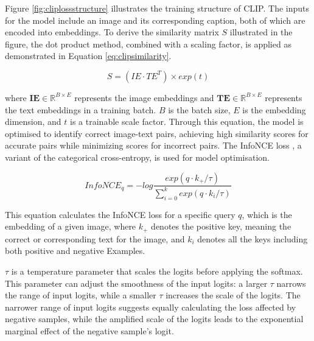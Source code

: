 Figure \ref{fig:cliplossstructure} illustrates the training structure of CLIP. The inputs for the model include an image and its corresponding caption, both of which are encoded into embeddings. To derive the similarity matrix $S$ illustrated in the figure, the dot product method, combined with a scaling factor, is applied as demonstrated in Equation \ref{eq:clipsimilarity}. 

\begin{equation}
    \label{eq:clipsimilarity}
    S = (IE \cdot TE^T) \times exp(t)
\end{equation}

where $\mathbf{IE} \in \mathbb{R}^{B \times E}$ represents the image embeddings and $\mathbf{TE} \in \mathbb{R}^{B \times E}$ represents the text embeddings in a training batch. $B$ is the batch size, $E$ is the embedding dimension, and $t$ is a trainable scale factor. Through this equation, the model is optimised to identify correct image-text pairs, achieving high similarity scores for accurate pairs while minimizing scores for incorrect pairs. The InfoNCE loss \parencite{oord2019representation}, a variant of the categorical cross-entropy, is used for model optimisation.

\begin{equation}
    \label{eq:infonce}
    InfoNCE_q = -log \frac{exp(q \cdot k_+ / \tau)}{\sum_{i=0}^{k}{exp(q \cdot k_i / \tau)}}
\end{equation}

This equation calculates the InfoNCE loss for a specific query $q$, which is the embedding of a given image, where $k_+$ denotes the positive key, meaning the correct or corresponding text for the image, and $k_i$ denotes all the keys including both positive and negative Examples. 

$\tau$ is a temperature parameter that scales the logits before applying the softmax. This parameter can adjust the smoothness of the input logits: a larger $\tau$ narrows the range of input logits, while a smaller $\tau$ increases the scale of the logits. The narrower range of input logits suggests equally calculating the loss affected by negative samples, while the amplified scale of the logits leads to the exponential marginal effect of the negative sample's logit.


\textbf{}
